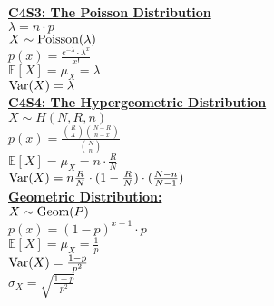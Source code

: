 \documentclass[letter, 12pt]{article}
\begin{document}
\begin{multicols}{2}
\textbf{\uline{C4S3: The Poisson Distribution}}\\
\(\lambda = n \cdot p\)\\
\(X \sim \textnormal{Poisson}(\lambda)\)\\
\(p(x) = \frac{e^{-\lambda}\cdot \lambda^x}{x!}\)\\
\(\mathds{E}[X] = \mu_X = \lambda\)\\
\(\textnormal{Var}(X) = \lambda\)\\
\textbf{\uline{C4S4: The Hypergeometric Distribution}}\\
\(X \sim H(N, R, n)\)\\
\(p(x) = \frac{{R \choose X}{{N-R} \choose {n-x}}}{{N \choose n}}\)\\
\(\mathds{E}[X] = \mu_X = n\cdot \frac{R}{N}\)\\
\(\textnormal{Var}(X) = n\frac{R}{N}\cdot(1-\frac{R}{N})\cdot(\frac{N-n}{N-1})\)\\
\textbf{\uline{Geometric Distribution:}}\\
\(X \sim \textnormal{Geom}(P)\)\\
\(p(x) = (1-p)^{x-1} \cdot p\)\\
\(\mathds{E}[X] = \mu_X = \frac{1}{p}\)\\
\(\textnormal{Var}(X) = \frac{1-p}{p^2}\)\\
\(\sigma_X = \sqrt{\frac{1-p}{p^2}}\)\\
\end{multicols}
\end{document}

